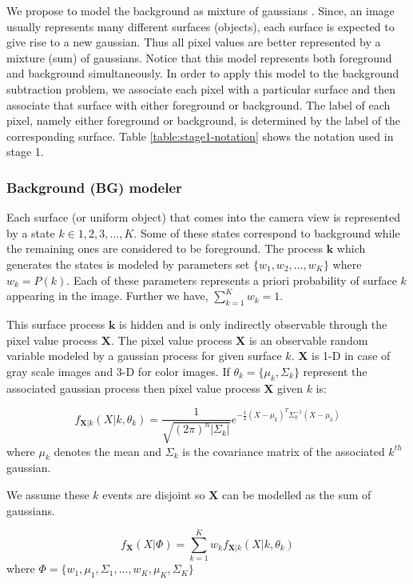 We propose to model the background as mixture of gaussians \cite{stauffer1999adaptive,power2002understanding}. Since, an image usually represents many different surfaces (objects), each surface is expected to give rise to a new gaussian. Thus all pixel values are better represented by a mixture (sum) of gaussians. Notice that this model represents both foreground and background simultaneously. In order to apply this model to the background subtraction problem, we associate each pixel with a particular surface and then associate that surface with either foreground or background. The label of each pixel, namely either foreground or background, is determined by the label of the corresponding surface. Table \ref{table:stage1-notation} shows the notation used in stage 1.


\subsubsection{Background (BG) modeler}
Each surface (or uniform object) that comes into the camera view is represented by a state $k \in {1,2,3,...,K}$. Some of these states correspond to  background while the remaining ones are considered to be foreground. The process  $\mathbf{k}$ which generates the states is modeled by parameters set $\{w_1, w_2, ..., w_K\}$ where $w_k = P(k)$. Each of these parameters represents  a priori probability of surface $k$ appearing in the image. Further we have, $\sum_{k=1}^K w_k=1$. 

This surface process $\mathbf{k}$ is hidden and is only indirectly observable through the pixel value process $\mathbf{X}$. The pixel value process $\mathbf{X}$ is an observable random variable modeled by a gaussian process for given surface $k$. $\mathbf{X}$ is 1-D in case of gray scale images and 3-D for color images.  If $\theta_k= \{\mu_k, \Sigma_k \}$  represent the associated gaussian process then pixel value process $\mathbf{X}$ given $k$ is: 

$$ f_{\mathbf{X}|k}(X|k,\theta_k)=\frac{1}{\sqrt{(2\pi)^n |\Sigma_k |}}e^{-\frac{1}{2}(X-\mu_k)^T \Sigma_k^{-1} (X-\mu_k)} $$
where $\mu_k$ denotes the mean and $\Sigma_k$ is the covariance matrix of the associated $k^{th}$ gaussian. 

We assume these $k$ events are disjoint so $\mathbf{X}$ can be modelled as the sum of gaussians. 

$$ f_{\mathbf{X}}(X|\Phi)=\sum_{k=1}^K w_k f_{\mathbf{X}|k}(X|k,\theta_k)  $$
where $ \Phi = \{w_1, \mu_1, \Sigma_1,..., w_K, \mu_K, \Sigma_K \}$ 

